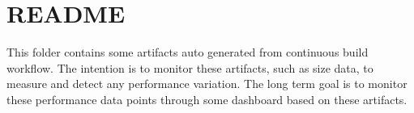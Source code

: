 \chapter{README}
\hypertarget{md__arduino_2_get_started_with_machine_learning_on_arduino_2tflite-micro-main_2data_2continuous__builds_2_r_e_a_d_m_e}{}\label{md__arduino_2_get_started_with_machine_learning_on_arduino_2tflite-micro-main_2data_2continuous__builds_2_r_e_a_d_m_e}
This folder contains some artifacts auto generated from continuous build workflow. The intention is to monitor these artifacts, such as size data, to measure and detect any performance variation. The long term goal is to monitor these performance data points through some dashboard based on these artifacts. 